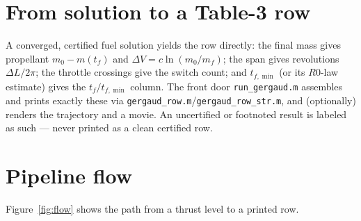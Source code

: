 \documentclass[11pt]{article}
\newcommand{\file}[1]{\texttt{\small #1}}
\begin{document}
\section{From solution to a Table-3 row}

A converged, certified fuel solution yields the row directly: the final mass
gives propellant $m_0-m(t_f)$ and $\Delta V=c\ln(m_0/m_f)$; the span gives
revolutions $\Delta L/2\pi$; the throttle crossings give the switch count; and
$t_{f,\min}$ (or its $R0$-law estimate) gives the $t_f/t_{f,\min}$ column. The
front door \file{run\_gergaud.m} assembles and prints exactly these via
\file{gergaud\_row.m}/\file{gergaud\_row\_str.m}, and (optionally) renders the
trajectory and a movie. An uncertified or footnoted result is labeled as such ---
never printed as a clean certified row.

\section{Pipeline flow}

Figure~\ref{fig:flow} shows the path from a thrust level to a printed row.
\end{document}
